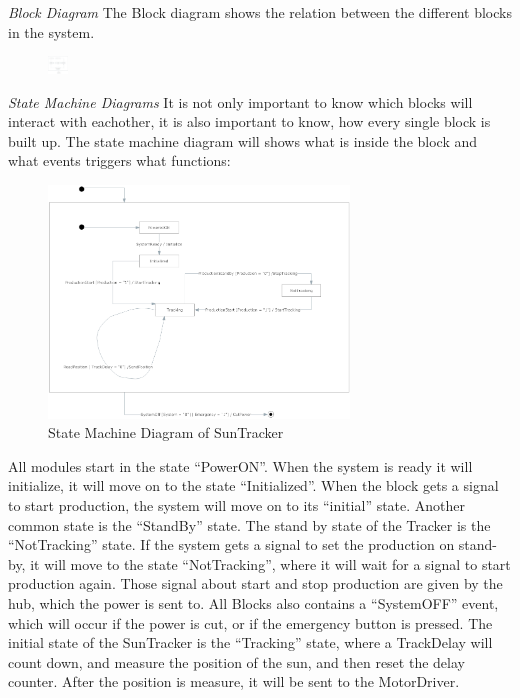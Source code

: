 \documentclass[12pt,a4paper]{report}
\begin{document}
\textit{Block Diagram}
The Block diagram shows the relation between the different blocks in the system. 

\begin{figure}[htbp]
\centering
\includegraphics[width=20px]{images/blockdiagram.png}
\caption{}
\label{fig:BlockDiagram}
\end{figure}


\textit{State Machine Diagrams}
It is not only important to know which blocks will interact with eachother, it is also important to know, how every single block is built up. The state machine diagram will shows what is inside the block and what events triggers what functions:

\begin{figure}[htbp]
\centering
\includegraphics[width=8cm]{images/SunTrackerUML}
\caption{State Machine Diagram of SunTracker}
\label{fig:SunTrackerUML}
\end{figure}



All modules start in the state “PowerON”. When the system is ready it will initialize, it will move on to the state “Initialized”. When the block gets a signal to start production, the system will move on to its “initial” state.
Another common state is the “StandBy” state. The stand by state of the Tracker is the “NotTracking” state. If the system gets a signal to set the production on stand-by, it will move to the state “NotTracking”, where it will wait for a signal to start production again. Those signal about start and stop production are given by the hub, which the power is sent to.
All Blocks also contains a “SystemOFF” event, which will occur if the power is cut, or if the emergency button is pressed.
The initial state of the SunTracker is the “Tracking” state, where a TrackDelay will count down, and measure the position of the sun, and then reset the delay counter. After the position is measure, it will be sent to the MotorDriver.
\end{document}
